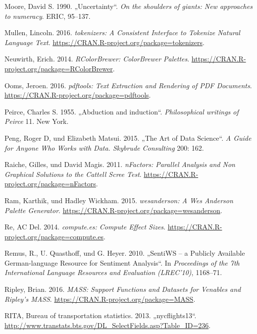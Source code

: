 \documentclass[12pt,ngerman,]{book}
\begin{document}
\hypertarget{ref-moore1990uncertainty}{}
Moore, David S. 1990. „Uncertainty``. \emph{On the shoulders of giants:
New approaches to numeracy}. ERIC, 95--137.

\hypertarget{ref-R-tokenizers}{}
Mullen, Lincoln. 2016. \emph{tokenizers: A Consistent Interface to
Tokenize Natural Language Text}.
\url{https://CRAN.R-project.org/package=tokenizers}.

\hypertarget{ref-R-RColorBrewer}{}
Neuwirth, Erich. 2014. \emph{RColorBrewer: ColorBrewer Palettes}.
\url{https://CRAN.R-project.org/package=RColorBrewer}.

\hypertarget{ref-R-pdftools}{}
Ooms, Jeroen. 2016. \emph{pdftools: Text Extraction and Rendering of PDF
Documents}. \url{https://CRAN.R-project.org/package=pdftools}.

\hypertarget{ref-peirce1955abduction}{}
Peirce, Charles S. 1955. „Abduction and induction``. \emph{Philosophical
writings of Peirce} 11. New York.

\hypertarget{ref-peng2015art}{}
Peng, Roger D, und Elizabeth Matsui. 2015. „The Art of Data Science``.
\emph{A Guide for Anyone Who Works with Data. Skybrude Consulting} 200:
162.

\hypertarget{ref-R-nFactors}{}
Raiche, Gilles, und David Magis. 2011. \emph{nFactors: Parallel Analysis
and Non Graphical Solutions to the Cattell Scree Test}.
\url{https://CRAN.R-project.org/package=nFactors}.

\hypertarget{ref-R-wesanderson}{}
Ram, Karthik, und Hadley Wickham. 2015. \emph{wesanderson: A Wes
Anderson Palette Generator}.
\url{https://CRAN.R-project.org/package=wesanderson}.

\hypertarget{ref-R-compute.es}{}
Re, AC Del. 2014. \emph{compute.es: Compute Effect Sizes}.
\url{https://CRAN.R-project.org/package=compute.es}.

\hypertarget{ref-remquahey2010}{}
Remus, R., U. Quasthoff, und G. Heyer. 2010. „SentiWS -- a Publicly
Available German-language Resource for Sentiment Analysis``. In
\emph{Proceedings of the 7th International Language Resources and
Evaluation (LREC'10)}, 1168--71.

\hypertarget{ref-R-MASS}{}
Ripley, Brian. 2016. \emph{MASS: Support Functions and Datasets for
Venables and Ripley's MASS}.
\url{https://CRAN.R-project.org/package=MASS}.

\hypertarget{ref-nycflights13}{}
RITA, Bureau of transportation statistics. 2013. „nycflights13``.
\url{http://www.transtats.bts.gov/DL_SelectFields.asp?Table_ID=236}.
\end{document}
